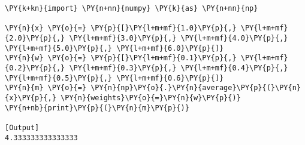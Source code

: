 \begin{Verbatim}[label=\makebox{\href{https://bitbucket.org/lbaldini/statnotes/src/master/snippets/np.average.py}{https://bitbucket.org/.../np.average.py}},commandchars=\\\{\}]
\PY{k+kn}{import} \PY{n+nn}{numpy} \PY{k}{as} \PY{n+nn}{np}

\PY{n}{x} \PY{o}{=} \PY{p}{[}\PY{l+m+mf}{1.0}\PY{p}{,} \PY{l+m+mf}{2.0}\PY{p}{,} \PY{l+m+mf}{3.0}\PY{p}{,} \PY{l+m+mf}{4.0}\PY{p}{,} \PY{l+m+mf}{5.0}\PY{p}{,} \PY{l+m+mf}{6.0}\PY{p}{]}
\PY{n}{w} \PY{o}{=} \PY{p}{[}\PY{l+m+mf}{0.1}\PY{p}{,} \PY{l+m+mf}{0.2}\PY{p}{,} \PY{l+m+mf}{0.3}\PY{p}{,} \PY{l+m+mf}{0.4}\PY{p}{,} \PY{l+m+mf}{0.5}\PY{p}{,} \PY{l+m+mf}{0.6}\PY{p}{]}
\PY{n}{m} \PY{o}{=} \PY{n}{np}\PY{o}{.}\PY{n}{average}\PY{p}{(}\PY{n}{x}\PY{p}{,} \PY{n}{weights}\PY{o}{=}\PY{n}{w}\PY{p}{)}
\PY{n+nb}{print}\PY{p}{(}\PY{n}{m}\PY{p}{)}

[Output]
4.333333333333333
\end{Verbatim}